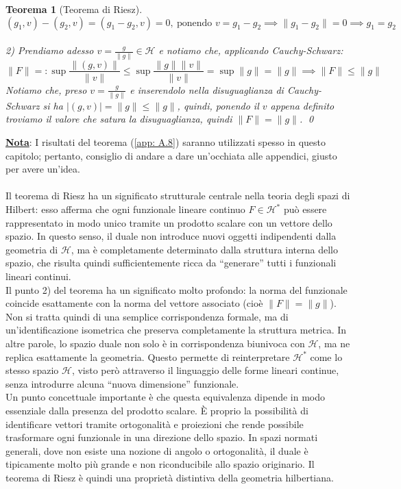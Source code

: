 \documentclass[a4paper,12pt]{report}
\newtheorem{teorema}{Teorema}[chapter]
\begin{document}
\begin{teorema}[Teorema di Riesz]
    \[(g_1,v)-(g_2,v)=(g_1-g_2,v)=0, \ \text{ponendo }v=g_1-g_2\implies \|g_1-g_2\|=0\implies g_1=g_2  \]
    \\ 2) Prendiamo adesso $v=\displaystyle\frac{g}{\|g\|}\in \mathscr{H}$ e notiamo che, applicando Cauchy-Schwarz: 
    \[\displaystyle \|F\|=:\sup \frac{\|(g,v)\|}{\|v\|}\leq \sup\frac{\|g\| \|v\|}{\|v\|}=\sup\|g\|=\|g\|\implies \|F\|\leq \|g\|\]
    Notiamo che, preso $v=\displaystyle\frac{g}{\|g\|}$ e inserendolo nella disuguaglianza di Cauchy-Schwarz si ha $|(g,v)|=\|g\|\leq \|g\|$, quindi, ponendo il $v$ appena definito troviamo il valore che satura la disuguaglianza, quindi $\|F\|=\|g\|$. \qed
\end{teorema}

\underline{\textbf{Nota}}: I risultati del teorema (\ref{app: A.8}) saranno utilizzati spesso in questo capitolo; pertanto, consiglio di andare a dare un'occhiata alle appendici, giusto per avere un'idea.
\\
\\ Il teorema di Riesz ha un significato strutturale centrale nella teoria degli spazi di Hilbert: esso afferma che ogni funzionale lineare continuo $F \in \mathscr{H}^*$ può essere rappresentato in modo unico tramite un prodotto scalare con un vettore dello spazio. In questo senso, il duale non introduce nuovi oggetti indipendenti dalla geometria di $\mathscr{H}$, ma è completamente determinato dalla struttura interna dello spazio, che risulta quindi sufficientemente ricca da “generare” tutti i funzionali lineari continui.
\\Il punto 2) del teorema ha un significato molto profondo: la norma del funzionale coincide esattamente con la norma del vettore associato (cioè $\|F\|=\|g\|$). Non si tratta quindi di una semplice corrispondenza formale, ma di un’identificazione isometrica che preserva completamente la struttura metrica. In altre parole, lo spazio duale non solo è in corrispondenza biunivoca con $\mathscr{H}$, ma ne replica esattamente la geometria. Questo permette di reinterpretare $\mathscr{H}^*$ come lo stesso spazio $\mathscr{H}$, visto però attraverso il linguaggio delle forme lineari continue, senza introdurre alcuna “nuova dimensione” funzionale.
\\Un punto concettuale importante è che questa equivalenza dipende in modo essenziale dalla presenza del prodotto scalare. È proprio la possibilità di identificare vettori tramite ortogonalità e proiezioni che rende possibile trasformare ogni funzionale in una direzione dello spazio. In spazi normati generali, dove non esiste una nozione di angolo o ortogonalità, il duale è tipicamente molto più grande e non riconducibile allo spazio originario. Il teorema di Riesz è quindi una proprietà distintiva della geometria hilbertiana.
\end{document}

